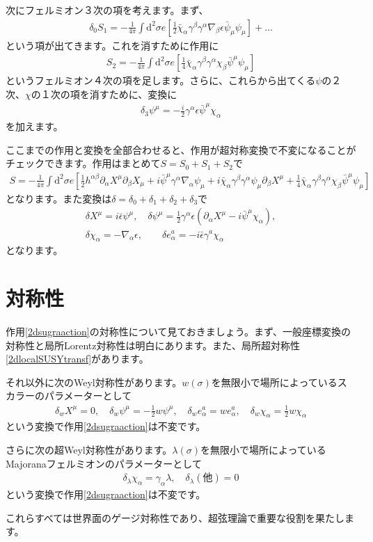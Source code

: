 \documentclass[report,paper=a4, fontsize=12pt, line_length=16cm, number_of_lines=33,dvipdfmx]{jlreq}
\numberwithin{equation}{chapter}
\numberwithin{equation}{section}
\newcommand{\del}{\partial}
\newcommand{\di}{\mathrm{d}}
\newcommand{\psib}{\bar{\psi}}
\newcommand{\chib}{\bar{\chi}}
\newcommand{\epsilonb}{\bar{\epsilon}}
\begin{document}
次にフェルミオン３次の項を考えます。まず、
\begin{align}
  \delta_{0}S_1=-\frac{1}{4\pi}\int \di^2\sigma e\left[ 
    \frac{1}{2}\chib_{\alpha}\gamma^{\beta}\gamma^{\alpha}\nabla_{\beta}\epsilon \psib_{\mu}\psi_{\mu}
   \right]+\dots
\end{align}
という項が出てきます。これを消すために作用に
\begin{align}
  S_{2}=
  -\frac{1}{4\pi}\int \di^2\sigma e\left[ 
    \frac{1}{4}\chib_{\alpha}\gamma^{\beta}\gamma^{\alpha}\chi_{\beta} \psib^{\mu}\psi_{\mu}
   \right]
\end{align}
というフェルミオン４次の項を足します。さらに、これらから出てくる$\psi$の２次、$\chi$の１次の項を消すために、変換に
\begin{align}
  \delta_{3}\psi^{\mu}=-\frac{i}{2}\gamma^{\alpha}\epsilon\psib^{\mu}\chi_{\alpha}
\end{align}
を加えます。

ここまでの作用と変換を全部合わせると、作用が超対称変換で不変になることがチェックできます。作用はまとめて$S=S_0+S_1+S_2$で
\begin{align}
  S=-\frac{1}{4\pi}\int \di^2\sigma e \left[ \frac12 h^{\alpha\beta}\del_{\alpha}X^{\mu}\del_{\beta}X_{\mu}
  +i\psib^{\mu}\gamma^{\alpha}\nabla_{\alpha}\psi_{\mu}+i
  \chib_{\alpha}\gamma^{\beta}\gamma^{\alpha}\psi_{\mu}\del_{\beta}X^{\mu}
  +\frac{1}{4}\chib_{\alpha}\gamma^{\beta}\gamma^{\alpha}\chi_{\beta} \psib^{\mu}\psi_{\mu}\right]
  \label{2dsugraaction}
\end{align}
となります。また変換は$\delta=\delta_0+\delta_1+\delta_2+\delta_3$で
\begin{align}
  \delta X^{\mu}=i\epsilonb \psi^{\mu},\quad
  \delta \psi^{\mu}=\frac12 \gamma^{\alpha}\epsilon(\del_{\alpha}X^{\mu}-i\psib^{\mu}\chi_{\alpha}),\nonumber\\
  \delta \chi_{\alpha}=-\nabla_{\alpha}\epsilon,\qquad
  \delta e^{a}_{\alpha}=-i\epsilonb \gamma^{a}\chi_{\alpha}
  \label{2dlocalSUSYtransf}
\end{align}
となります。

\section{対称性}

作用\eqref{2dsugraaction}の対称性について見ておきましょう。まず、一般座標変換の対称性と局所Lorentz対称性は明白にあります。また、局所超対称性\eqref{2dlocalSUSYtransf}があります。

それ以外に次のWeyl対称性があります。$w(\sigma)$を無限小で場所によっているスカラーのパラメーターとして
\begin{align}
  \delta_{w}X^{\mu}=0,\quad
  \delta_{w}\psi^{\mu}=-\frac12 w\psi^{\mu},\quad
  \delta_{w} e^{a}_{\alpha}=w e^{a}_{\alpha},\quad
  \delta_{w} \chi_{\alpha}=\frac12 w\chi_{\alpha}
\end{align}
という変換で作用\eqref{2dsugraaction}は不変です。

さらに次の超Weyl対称性があります。$\lambda(\sigma)$を無限小で場所によっているMajoranaフェルミオンのパラメーターとして
\begin{align}
  \delta_{\lambda}\chi_{\alpha}=\gamma_{\alpha}\lambda,\quad
  \delta_{\lambda}(\text{他})=0
\end{align}
という変換で作用\eqref{2dsugraaction}は不変です。

これらすべては世界面のゲージ対称性であり、超弦理論で重要な役割を果たします。
\end{document}
